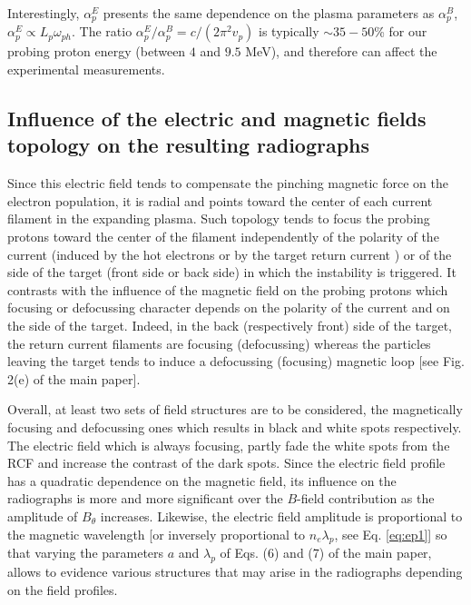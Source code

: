 \documentclass[aps,showpacs,superscriptaddress]{revtex4}
\begin{document}
Interestingly,  $\alpha^E_p$ presents the same dependence on the plasma parameters as  $\alpha^B_p$,  $\alpha^E_p\propto L_p \omega_{ph}$.  The ratio $\alpha^E_p/\alpha^B_p =c/(2\pi^2v_p)$  is typically $\sim 35-50$\% for our  probing proton energy (between $4$ and $9.5$ MeV), and therefore can affect  the experimental measurements.

\subsection{Influence of the electric and magnetic fields topology on the resulting radiographs}
Since this electric field tends to compensate the pinching magnetic force on the electron population, it is radial and points toward the center of each current filament in the expanding plasma. Such topology tends to focus the probing protons toward the center of the filament independently of the polarity of the current (induced by  the hot electrons or by the target return current ) or of the side of the target (front side or back side) in which the instability is triggered. 
It contrasts with the influence of the magnetic field on the probing protons which focusing or defocussing character depends on the polarity of the current and on the side of the target. Indeed,  in the back (respectively front) side of the target, the return current filaments are focusing (defocussing) whereas the   particles leaving the target  tends to induce a defocussing (focusing) magnetic loop [see Fig. 2(e) of the main paper].

Overall,   at least two sets of field structures  are to be considered, the magnetically focusing  and  defocussing ones which  results in black and white spots respectively. 
The electric field which is always focusing, partly  fade the white spots from the RCF and increase the contrast of the dark spots.  
Since the electric field profile has a quadratic dependence on the magnetic field, its influence on the radiographs is more and more significant over the $B$-field contribution as the amplitude of $B_\theta$  increases. Likewise,  the electric field amplitude is proportional to the magnetic wavelength [or inversely proportional to $n_e\lambda_p$, see Eq. \eqref{eq:ep1}] so that varying the 
parameters $a$ and $\lambda_p$ of Eqs. (6) and (7) of the main paper,
allows to evidence various structures that may arise in the radiographs depending on the field profiles.
\end{document}

